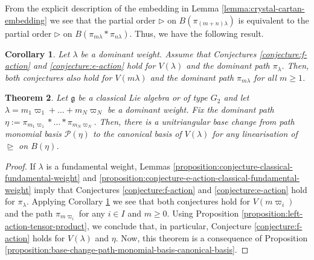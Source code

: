 \documentclass[final]{amsart}
\theoremstyle{plain}
\newtheorem{corollary}{Corollary}[section]
\newtheorem{theorem}[corollary]{Theorem}
\theoremstyle{definition}
\newcommand{\calP}{\mathcal P}
\newcommand{\frakg}{\mathfrak g}
\begin{document}
From the explicit description of the embedding in Lemma \ref{lemma:crystal-cartan-embedding} we see that the partial order $\triangleright$ on $B(\pi_{(m+n)\lambda})$ is equivalent to the partial order $\triangleright$ on $B(\pi_{m\lambda} * \pi_{n\lambda})$.
Thus, we have the following result.

\begin{corollary}
    \label{corollary:left-action-straight-line-path-dilation}
    Let $\lambda$ be a dominant weight.
    Assume that Conjectures \ref{conjecture:f-action} and \ref{conjecture:e-action} hold for $V(\lambda)$ and the dominant path $\pi_\lambda$.
    Then, both conjectures also hold for $V(m\lambda)$ and the dominant path $\pi_{m\lambda}$ for all $m \ge 1$.
\end{corollary}

\begin{theorem}
    \label{theorem:base-change-path-monomial-basis-canonical-basis-classical-g2}
    Let $\frakg$ be a classical Lie algebra or of type $G_2$ and let $\lambda = m_1\varpi_1 + \dots + m_N\varpi_N$ be a dominant weight.
    Fix the dominant path $\eta := \pi_{m_1\varpi_1} * \dots * \pi_{m_N\varpi_N}$.
    Then, there is a unitriangular base change from path monomial basis $\calP(\eta)$ to the canonical basis of $V(\lambda)$ for any linearisation of $\trianglerighteq$ on $B(\eta)$.
\end{theorem}
\begin{proof}
    If $\lambda$ is a fundamental weight, Lemmas \ref{proposition:conjecture-classical-fundamental-weight} and \ref{proposition:conjecture-e-action-classical-fundamental-weight} imply that Conjectures \ref{conjecture:f-action} and \ref{conjecture:e-action} hold for $\pi_\lambda$.
    Applying Corollary \ref{corollary:left-action-straight-line-path-dilation} we see that both conjectures hold for $V(m\varpi_i)$ and the path $\pi_{m\varpi_i}$ for any $i\in I$ and $m \ge 0$.
    Using Proposition \ref{proposition:left-action-tensor-product}, we conclude that, in particular, Conjecture \ref{conjecture:f-action} holds for $V(\lambda)$ and $\eta$.
    Now, this theorem is a consequence of Proposition \ref{proposition:base-change-path-monomial-basis-canonical-basis}.
\end{proof}

\printbibliography
\end{document}
